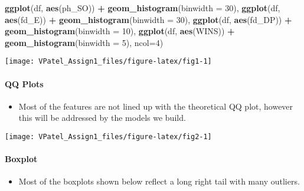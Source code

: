 \documentclass[]{article}
\newenvironment{Shaded}{\begin{snugshade}}{\end{snugshade}}
\newcommand{\DataTypeTok}[1]{\textcolor[rgb]{0.13,0.29,0.53}{#1}}
\newcommand{\DecValTok}[1]{\textcolor[rgb]{0.00,0.00,0.81}{#1}}
\newcommand{\KeywordTok}[1]{\textcolor[rgb]{0.13,0.29,0.53}{\textbf{#1}}}
\newcommand{\NormalTok}[1]{#1}
\newcommand{\OperatorTok}[1]{\textcolor[rgb]{0.81,0.36,0.00}{\textbf{#1}}}
\newcommand{\StringTok}[1]{\textcolor[rgb]{0.31,0.60,0.02}{#1}}
\providecommand{\tightlist}{%
  \setlength{\itemsep}{0pt}\setlength{\parskip}{0pt}}
\let\oldparagraph\paragraph
\renewcommand{\paragraph}[1]{\oldparagraph{#1}\mbox{}}
\begin{document}
\begin{Shaded}
\begin{Highlighting}[]
             \KeywordTok{ggplot}\NormalTok{(df, }\KeywordTok{aes}\NormalTok{(ph_SO)) }\OperatorTok{+}\StringTok{ }\KeywordTok{geom_histogram}\NormalTok{(}\DataTypeTok{binwidth =} \DecValTok{30}\NormalTok{),}
             \KeywordTok{ggplot}\NormalTok{(df, }\KeywordTok{aes}\NormalTok{(fd_E)) }\OperatorTok{+}\StringTok{ }\KeywordTok{geom_histogram}\NormalTok{(}\DataTypeTok{binwidth =} \DecValTok{30}\NormalTok{),}
             \KeywordTok{ggplot}\NormalTok{(df, }\KeywordTok{aes}\NormalTok{(fd_DP)) }\OperatorTok{+}\StringTok{ }\KeywordTok{geom_histogram}\NormalTok{(}\DataTypeTok{binwidth =} \DecValTok{10}\NormalTok{),}
             \KeywordTok{ggplot}\NormalTok{(df, }\KeywordTok{aes}\NormalTok{(WINS)) }\OperatorTok{+}\StringTok{ }\KeywordTok{geom_histogram}\NormalTok{(}\DataTypeTok{binwidth =} \DecValTok{5}\NormalTok{),}
             \DataTypeTok{ncol=}\DecValTok{4}\NormalTok{)}
\end{Highlighting}
\end{Shaded}

\begin{center}\texttt{[image: VPatel\_Assign1\_files/figure-latex/fig1-1]} \end{center}

\hypertarget{qq-plots}{%
\paragraph{QQ Plots}\label{qq-plots}}

\begin{itemize}
\tightlist
\item
  Most of the features are not lined up with the theoretical QQ plot,
  however this will be addressed by the models we build.
\end{itemize}

\begin{center}\texttt{[image: VPatel\_Assign1\_files/figure-latex/fig2-1]} \end{center}

\hypertarget{boxplot}{%
\paragraph{Boxplot}\label{boxplot}}

\begin{itemize}
\tightlist
\item
  Most of the boxplots shown below reflect a long right tail with many
  outliers.
\end{itemize}
\end{document}

